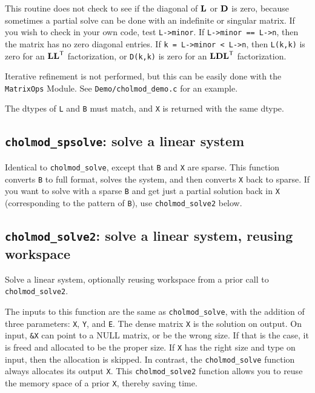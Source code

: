 \documentclass[11pt]{article}
\newcommand{\m}[1]{{\bf{#1}}}       %
\newcommand{\tr}{^{\sf T}}          %
\begin{document}
This routine does not check to see if the diagonal of $\m{L}$ or $\m{D}$ is
zero, because sometimes a partial solve can be done with an indefinite or
singular matrix.  If you wish to check in your own code, test {\tt L->minor}.
If {\tt L->minor == L->n}, then the matrix has no zero diagonal entries.  If
{\tt k = L->minor < L->n}, then {\tt L(k,k)} is zero for an $\m{LL}\tr$
factorization, or {\tt D(k,k)} is zero for an $\m{LDL}\tr$ factorization.

Iterative refinement is not performed, but this can be easily done with
the {\tt MatrixOps} Module.  See {\tt Demo/cholmod\_demo.c} for an example.

The dtypes of \verb'L' and \verb'B' must match, and \verb'X' is returned
with the same dtype.

\subsection{{\tt cholmod\_spsolve}: solve a linear system}


Identical to {\tt cholmod\_solve}, except that {\tt B} and {\tt X} are sparse.
This function converts {\tt B} to full format, solves the system, and then
converts {\tt X} back to sparse.  If you want to solve with a sparse {\tt B}
and get just a partial solution back in {\tt X} (corresponding to the pattern
of {\tt B}), use {\tt cholmod\_solve2} below.

\subsection{{\tt cholmod\_solve2}: solve a linear system, reusing workspace}


Solve a linear system, optionally reusing workspace from a prior call
to {\tt cholmod\_solve2}.

The inputs to this function are the same as {\tt cholmod\_solve}, with the
addition of three parameters: {\tt X}, {\tt Y}, and {\tt E}.  The dense matrix
{\tt X} is the solution on output.  On input, {\tt \&X} can point to a NULL
matrix, or be the wrong size.  If that is the case, it is freed and allocated
to be the proper size.  If {\tt X} has the right size and type on input, then
the allocation is skipped.  In contrast, the {\tt cholmod\_solve} function
always allocates its output {\tt X}.  This {\tt cholmod\_solve2} function
allows you to reuse the memory space of a prior {\tt X}, thereby saving time.
\end{document}

